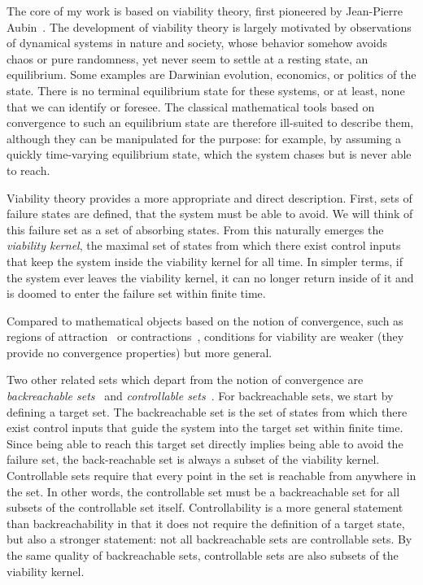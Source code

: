 The core of my work is based on viability theory, first pioneered by Jean-Pierre Aubin~\cite{aubin2011viability}. The development of viability theory is largely motivated by observations of dynamical systems in nature and society, whose behavior somehow avoids chaos or pure randomness, yet never seem to settle at a resting state, an equilibrium.
Some examples are Darwinian evolution, economics, or politics of the state. There is no terminal equilibrium state for these systems, or at least, none that we can identify or foresee.
The classical mathematical tools based on convergence to such an equilibrium state are therefore ill-suited to describe them, although they can be manipulated for the purpose: for example, by assuming a quickly time-varying equilibrium state, which the system chases but is never able to reach. \par
Viability theory provides a more appropriate and direct description. First, sets of failure states are defined, that the system must be able to avoid. We will think of this failure set as a set of absorbing states. From this naturally emerges the \emph{viability kernel}, the maximal set of states from which there exist control inputs that keep the system inside the viability kernel for all time. In simpler terms, if the system ever leaves the viability kernel, it can no longer return inside of it and is doomed to enter the failure set within finite time. \par
Compared to mathematical objects based on the notion of convergence, such as regions of attraction~\cite[(section 6.4)]{strogatz2018nonlinear} or contractions~\cite{bazzi2018stability}, conditions for viability are weaker (they provide no convergence properties) but more general. \par
Two other related sets which depart from the notion of convergence are \emph{backreachable sets}~\cite{bansal2017hamilton} and \emph{controllable sets}~\cite{zaytsev2018boundaries}. For backreachable sets, we start by defining a target set.
The backreachable set is the set of states from which there exist control inputs that guide the system into the target set within finite time.
Since being able to reach this target set directly implies being able to avoid the failure set, the back-reachable set is always a subset of the viability kernel.
Controllable sets require that every point in the set is reachable from anywhere in the set. In other words, the controllable set must be a backreachable set for all subsets of the controllable set itself. Controllability is a more general statement than backreachability in that it does not require the definition of a target state, but also a stronger statement: not all backreachable sets are controllable sets. By the same quality of backreachable sets, controllable sets are also subsets of the viability kernel. \par
